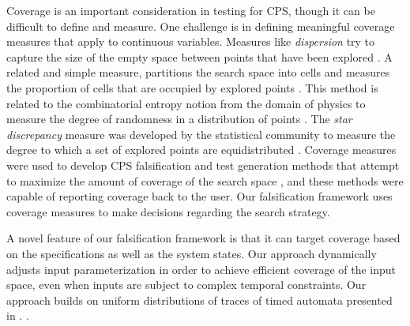Coverage is an important consideration in testing for CPS, though it can be 
difficult to define and measure.
One challenge is in defining meaningful coverage measures that apply to continuous
variables.
Measures like \emph{dispersion} try to capture the size of the empty space between points that have been explored \cite{Esposito04}.
A related and simple measure, partitions the search space into cells and measures the proportion of cells that are occupied by explored points \cite{Skruch2011}.
This method is related to the combinatorial entropy notion from the domain of physics to measure the degree of randomness in a distribution of points \cite{Gabbay06}.
The \emph{star discrepancy} measure was developed by the statistical community 
to measure the degree to which a set of explored points are equidistributed
\cite{Heinrich03}. 
Coverage measures were used to develop CPS falsification and test generation methods 
 that 
attempt to maximize the amount of coverage of the search space \cite{DangN09,Dreossi2015,CAV2017}, and these methods were
capable of reporting coverage back to the user.
Our falsification framework uses coverage measures to make decisions regarding the search strategy.

A novel feature of our falsification framework is that it can 
target coverage based on the specifications as well as the system states.
Our approach dynamically adjusts input parameterization in order to achieve
efficient coverage of the input space, even when inputs are subject to
complex temporal constraints. Our approach builds on uniform
distributions of traces of timed automata presented in \cite{}.
.



